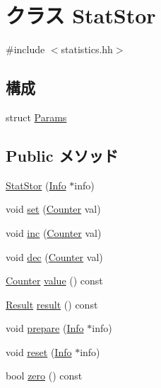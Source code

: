 \hypertarget{classStats_1_1StatStor}{
\section{クラス StatStor}
\label{classStats_1_1StatStor}
}


{\ttfamily \#include $<$statistics.hh$>$}\subsection*{構成}
\begin{DoxyCompactItemize}
\item 
struct \hyperlink{structStats_1_1StatStor_1_1Params}{Params}
\end{DoxyCompactItemize}
\subsection*{Public メソッド}
\begin{DoxyCompactItemize}
\item 
\hyperlink{classStats_1_1StatStor_a1f249890adfa3148159d8dd36c053caf}{StatStor} (\hyperlink{classStats_1_1Info}{Info} $\ast$info)
\item 
void \hyperlink{classStats_1_1StatStor_a7687ba04921eb09ab374fb40c4e1eb9d}{set} (\hyperlink{namespaceStats_ac35128c026c72bb36af9cea00774e8a6}{Counter} val)
\item 
void \hyperlink{classStats_1_1StatStor_a8e52de5dde7b3cab8328c91dbbb1f229}{inc} (\hyperlink{namespaceStats_ac35128c026c72bb36af9cea00774e8a6}{Counter} val)
\item 
void \hyperlink{classStats_1_1StatStor_a89d7b0cf8f0932a96f6728d61d5818b1}{dec} (\hyperlink{namespaceStats_ac35128c026c72bb36af9cea00774e8a6}{Counter} val)
\item 
\hyperlink{namespaceStats_ac35128c026c72bb36af9cea00774e8a6}{Counter} \hyperlink{classStats_1_1StatStor_aa9e486cb7eb0ad44f5f89923594b68a4}{value} () const 
\item 
\hyperlink{namespaceStats_ad874d2cfd4b4a29ebd480bb2e67f20ae}{Result} \hyperlink{classStats_1_1StatStor_ae050da86c3d8e8a677a0bdeb7971e1e3}{result} () const 
\item 
void \hyperlink{classStats_1_1StatStor_a496667796a30696e960f80f4e3d69e69}{prepare} (\hyperlink{classStats_1_1Info}{Info} $\ast$info)
\item 
void \hyperlink{classStats_1_1StatStor_a10d9d71be6e0d2194999bb5dd5280e2d}{reset} (\hyperlink{classStats_1_1Info}{Info} $\ast$info)
\item 
bool \hyperlink{classStats_1_1StatStor_a4e72b01b727d3165e75cba84eb507491}{zero} () const 
\end{DoxyCompactItemize}
